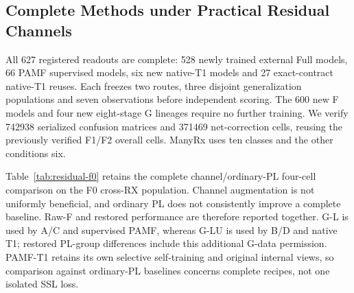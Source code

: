 \subsection{Complete Methods under Practical Residual Channels}

All 627 registered readouts are complete: 528 newly trained external Full models, 66 PAMF supervised models, six new native-T1 models and 27 exact-contract native-T1 reuses. Each freezes two routes, three disjoint generalization populations and seven observations before independent scoring. The 600 new F models and four new eight-stage G lineages require no further training. We verify 742938 serialized confusion matrices and 371469 net-correction cells, reusing the previously verified F1/F2 overall cells. ManyRx uses ten classes and the other conditions six.

Table~\ref{tab:residual-f0} retains the complete channel/ordinary-PL four-cell comparison on the F0 cross-RX population. Channel augmentation is not uniformly beneficial, and ordinary PL does not consistently improve a complete baseline. Raw-F and restored performance are therefore reported together. G-L is used by A/C and supervised PAMF, whereas G-LU is used by B/D and native T1; restored PL-group differences include this additional G-data permission. PAMF-T1 retains its own selective self-training and original internal views, so comparison against ordinary-PL baselines concerns complete recipes, not one isolated SSL loss.

